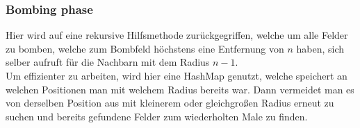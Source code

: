\subsubsection{Bombing phase}
Hier wird auf eine rekursive Hilfsmethode zurückgegriffen, welche um alle Felder zu bomben, welche zum Bombfeld höchstens eine Entfernung von $n$ haben, sich selber aufruft für die Nachbarn mit dem Radius $n-1$.\\
Um effizienter zu arbeiten, wird hier eine HashMap genutzt, welche speichert an welchen Positionen man mit welchem Radius bereits war. Dann vermeidet man es von derselben Position aus mit kleinerem oder gleichgroßen Radius erneut zu suchen und bereits gefundene Felder zum wiederholten Male zu finden.